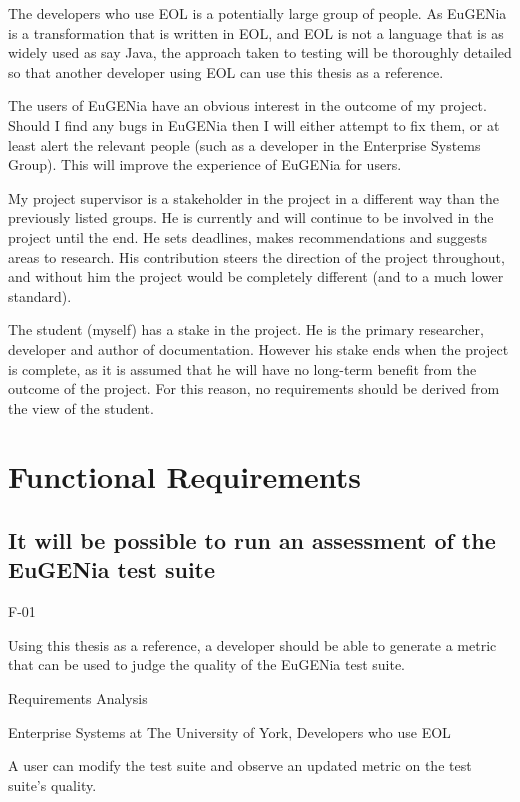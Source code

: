 The developers who use EOL is a potentially large group of people. As EuGENia is a transformation that is written in EOL, and EOL is not a language that is as widely used as say Java, the approach taken to testing will be thoroughly detailed so that another developer using EOL can use this thesis as a reference.

The users of EuGENia have an obvious interest in the outcome of my project. Should I find any bugs in EuGENia then I will either attempt to fix them, or at least alert the relevant people (such as a developer in the Enterprise Systems Group). This will improve the experience of EuGENia for users.

My project supervisor is a stakeholder in the project in a different way than the previously listed groups. He is currently and will continue to be involved in the project until the end. He sets deadlines, makes recommendations and suggests areas to research. His contribution steers the direction of the project throughout, and without him the project would be completely different (and to a much lower standard).

The student (myself) has a stake in the project. He is the primary researcher, developer and author of documentation. However his stake ends when the project is complete, as it is assumed that he will have no long-term benefit from the outcome of the project. For this reason, no requirements should be derived from the view of the student.

\section{Functional Requirements}

\subsection{It will be possible to run an assessment of the EuGENia test suite}
\begin{description}[style=sameline,leftmargin=4.5cm,nolistsep]
\item[\hspace*{0.3cm}Label] F-01
\item[\hspace*{0.3cm}Description] Using this thesis as a reference, a developer should be able to generate a metric that can be used to judge the quality of the EuGENia test suite.
\item[\hspace*{0.3cm}Source] Requirements Analysis
\item[\hspace*{0.3cm}Stakeholders] Enterprise Systems at The University of York, Developers who use EOL
\item[\hspace*{0.3cm}Satisfiable Conditions] A user can modify the test suite and observe an updated metric on the test suite's quality.
\end{description}

